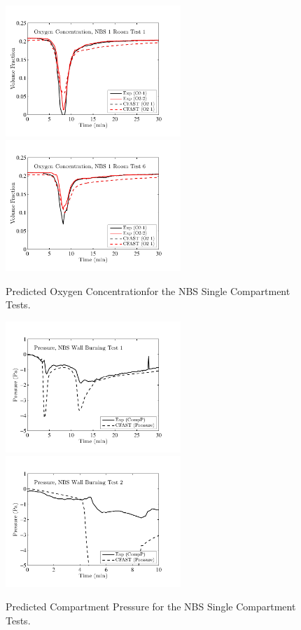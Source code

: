 \begin{figure}[p]
\begin{center}
\includegraphics[width=2.6in]{FIGURES/NBS/1rfurn1_Oxygen} \\
\includegraphics[width=2.6in]{FIGURES/NBS/1rfurn6_Oxygen} 
\end{center}
\caption{Predicted Oxygen Concentrationfor the NBS Single Compartment Tests.} \label{fig:1Room_Gases}
\end{figure}

\begin{figure}[p]
\begin{center}
\includegraphics[width=2.6in]{FIGURES/NBS/1rwall1_Pressure} \\
\includegraphics[width=2.6in]{FIGURES/NBS/1rwall2_Pressure} 
\end{center}
\caption{Predicted Compartment Pressure for the NBS Single Compartment Tests.} \label{fig:1Room_Pressure}
\end{figure}

